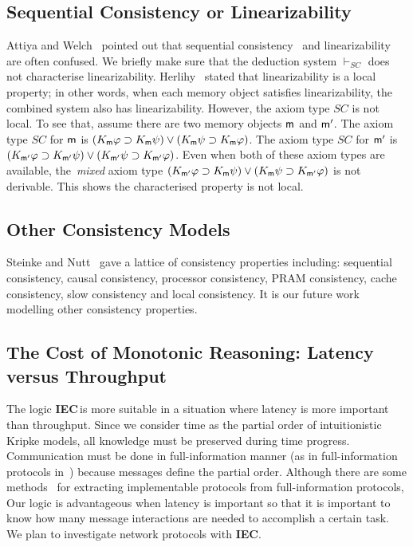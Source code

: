 \documentclass[doctor]{iscs-thesis}
\newcommand{\iec}{{\rm {\textbf{IEC}}}}
\newcommand{\memory}{{\sf m}}
\begin{document}
\subsection{Sequential Consistency or Linearizability}

Attiya and Welch~\cite{attiya1994sequential} pointed out that 
sequential consistency~\cite{lamport1979make} and
linearizability~\cite{herlihy1990linearizability} are often confused.
We briefly make sure that the deduction system $\vdash_{SC}$ does
not characterise linearizability.
Herlihy~\cite{herlihy1990linearizability} stated that
linearizability is a local
property; in other words,
when each memory object satisfies linearizability, the combined system also has linearizability.
However, the axiom type $SC$ is not local.
To see that, assume there are two memory objects $\memory$ and $\memory'$.
The axiom type $SC$ for $\memory$ is $(K_\memory \varphi\supset K_\memory
\psi)\vee (K_\memory \psi\supset K_\memory\varphi)$.
The axiom type $SC$ for $\memory'$ is $(K_{\memory'} \varphi\supset K_{\memory'}
\psi)\vee (K_{\memory'} \psi\supset K_{\memory'}\varphi)$.
Even when both of these axiom types are available,
the~\textit{mixed} axiom type $(K_{\memory'} \varphi\supset K_{\memory}
\psi)\vee (K_{\memory} \psi\supset K_{\memory'}\varphi)$ is not derivable. This shows
the characterised property is not local.

\subsection{Other Consistency Models}

Steinke and Nutt~\cite{steinke2004unified} gave a lattice of consistency properties
including: sequential consistency, causal consistency, processor consistency, PRAM
consistency, cache consistency, slow consistency and local consistency.
It is our future work modelling other consistency properties.

\subsection{The Cost of Monotonic Reasoning: Latency versus Throughput}

The logic \iec\,is more suitable in a situation where latency is more important than throughput.
Since we consider time as the partial order of intuitionistic Kripke models,
all knowledge must be preserved during time progress.
Communication must be done in full-information manner (as in
full-information protocols in~\cite{182113}) because messages
define the partial order.
 Although there are some methods~\cite{182113, halpern1990knowledge, halpern1987using,
 halpern1985formal}
  for extracting implementable protocols from
 full-information protocols, 
Our logic is advantageous when latency is important so that
it is important to know how many message interactions are needed to accomplish a certain
task.  We plan to investigate network protocols with \iec.
\end{document}
